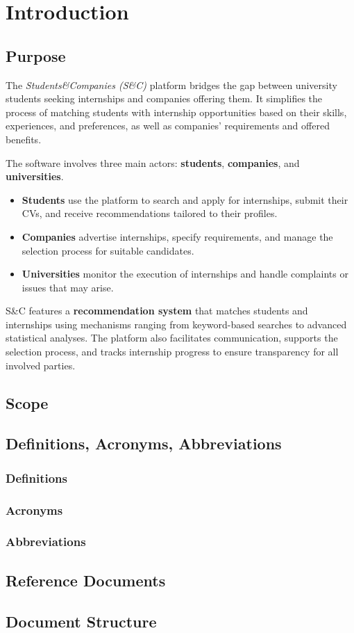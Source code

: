 \chapter{Introduction}

\section{Purpose}


The \textit{Students\&Companies (S\&C)} platform bridges the gap between university students seeking
internships and companies offering them. It simplifies the process of matching students with internship
opportunities based on their skills, experiences, and preferences, as well as companies' requirements
and offered benefits.

The software involves three main actors: \textbf{students}, \textbf{companies}, and \textbf{universities}.

\begin{itemize}
    \item \textbf{Students} use the platform to search and apply for internships, submit their CVs, and
    receive recommendations tailored to their profiles.
    \item \textbf{Companies} advertise internships, specify requirements, and manage the selection
    process for suitable candidates.
    \item \textbf{Universities} monitor the execution of internships and handle complaints or
    issues that may arise.
\end{itemize}

S\&C features a \textbf{recommendation system} that matches students and internships using mechanisms
ranging from keyword-based searches to advanced statistical analyses. The platform also facilitates
communication, supports the selection process, and tracks internship progress to ensure transparency
for all involved parties.

\newpage
\section{Scope}

\newpage
\section{Definitions, Acronyms, Abbreviations}
\subsection{Definitions}
\subsection{Acronyms}
\subsection{Abbreviations}

\newpage
\section{Reference Documents}

\newpage
\section{Document Structure}